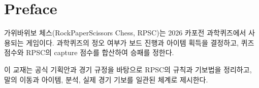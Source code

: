 \chapter*{Preface}
가위바위보 체스(RockPaperScissors Chess, RPSC)는 2026 카포전 과학퀴즈에서 사용되는 게임이다. 과학퀴즈의 정오 여부가 보드 진행과 아이템 획득을 결정하고, 퀴즈 점수와 RPSC의 capture 점수를 합산하여 승패를 정한다.

이 교재는 공식 기획안과 경기 규정을 바탕으로 RPSC의 규칙과 기보법을 정리하고, 말의 이동과 아이템, 분석, 실제 경기 기보를 일관된 체계로 제시한다.
